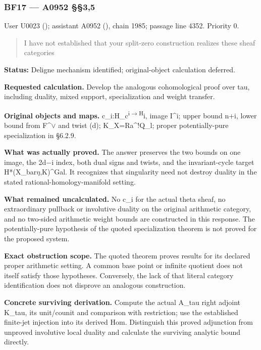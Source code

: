 \documentclass[10pt,a4paper,oneside]{report}
\begin{document}
\subsubsection{BF17 --- A0952 §§3,5}\label{bf17-a0952-35}

User U0023 (\protect{});
assistant A0952 (\protect{}),
chain 1985; passage line 4352. Priority 0.

\begin{quote}
I have not established that your split-zero construction realizes these
sheaf categories
\end{quote}

\textbf{Status:} Deligne mechanism identified; original-object
calculation deferred.

\textbf{Requested calculation.} Develop the analogous cohomological
proof over tau, including duality, mixed support, specialization and
weight transfer.

\textbf{Original objects and maps.}
c\_i:H\_c\textsuperscript{i\allowbreak{}\ensuremath{→}\allowbreak{}H}i,
image I\^{}i; upper bound n+i, lower bound from
F\textasciicircum{}\allowbreak{}\ensuremath{∨}\allowbreak{} and twist
(d); K\_X=Ra\^{}!Q\_l; proper potentially-pure specialization in §6.2.9.

\textbf{What was actually proved.} The answer preserves the two bounds
on one image, the 2d\allowbreak{}\ensuremath{−}\allowbreak{}i index,
both dual signs and twists, and the invariant-cycle target
H*(X\_bar\allowbreak{}\ensuremath{η}\allowbreak{},K)\textasciicircum{}Gal.
It recognizes that singularity need not destroy duality in the stated
rational-homology-manifold setting.

\textbf{What remained uncalculated.} No c\_i for the actual theta sheaf,
no extraordinary pullback or involutive duality on the original
arithmetic category, and no two-sided arithmetic weight bounds are
constructed in this response. The potentially-pure hypothesis of the
quoted specialization theorem is not proved for the proposed system.

\textbf{Exact obstruction scope.} The quoted theorem proves results for
its declared proper arithmetic setting. A common base point or infinite
quotient does not itself satisfy those hypotheses. Conversely, the lack
of that literal category identification does not disprove an analogous
construction.

\textbf{Concrete surviving derivation.} Compute the actual A\_tau right
adjoint K\_tau, its unit/counit and comparison with restriction; use the
established finite-jet injection into its derived Hom. Distinguish this
proved adjunction from unproved involutive local duality and calculate
the surviving analytic bound directly.
\end{document}
